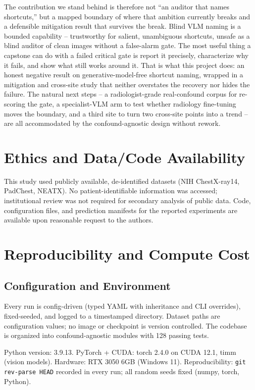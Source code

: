 \documentclass{ieeeaccess}
\begin{document}
The contribution we stand behind is therefore not ``an auditor that names
shortcuts,'' but a mapped boundary of where that ambition currently breaks
and a defensible mitigation result that survives the break. Blind VLM
naming is a bounded capability -- trustworthy for salient, unambiguous
shortcuts, unsafe as a blind auditor of clean images without a false-alarm
gate. The most useful thing a capstone can do with a failed critical gate is
report it precisely, characterize why it fails, and show what still works
around it. That is what this project does: an honest negative result on
generative-model-free shortcut naming, wrapped in a mitigation and
cross-site study that neither overstates the recovery nor hides the
failure. The natural next steps -- a radiologist-grade real-confound corpus
for re-scoring the gate, a specialist-VLM arm to test whether radiology
fine-tuning moves the boundary, and a third site to turn two cross-site
points into a trend -- are all accommodated by the confound-agnostic design
without rework.

\section*{Ethics and Data/Code Availability}
This study used publicly available, de-identified datasets (NIH
ChestX-ray14, PadChest, NEATX). No patient-identifiable information was
accessed; institutional review was not required for secondary analysis of
public data. Code, configuration files, and prediction manifests for the
reported experiments are available upon reasonable request to the authors.

\appendices

\section{Reproducibility and Compute Cost}
\subsection{Configuration and Environment}
Every run is config-driven (typed YAML with inheritance and CLI overrides),
fixed-seeded, and logged to a timestamped directory. Dataset paths are
configuration values; no image or checkpoint is version controlled. The
codebase is organized into confound-agnostic modules with 128 passing
tests.

Python version: 3.9.13. PyTorch + CUDA: torch 2.4.0 on CUDA 12.1, timm
(vision models). Hardware: RTX 3050 6GB (Windows 11). Reproducibility:
\texttt{git rev-parse HEAD} recorded in every run; all random seeds fixed
(numpy, torch, Python).
\end{document}
